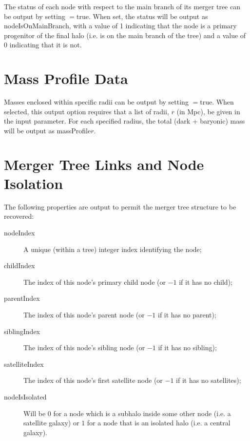 The status of each node with respect to the main branch of its merger tree can be output by setting {\normalfont \ttfamily [outputMainBranchStatus]}$=${\normalfont \ttfamily true}. When set, the status will be output as {\normalfont \ttfamily nodeIsOnMainBranch}, with a value of 1 indicating that the node is a primary progenitor of the final halo (i.e. is on the main branch of the tree) and a value of 0 indicating that it is not.

\section{Mass Profile Data}

Masses enclosed within specific radii can be output by setting {\normalfont \ttfamily [outputMassProfileData]}$=${\normalfont \ttfamily true}. When selected, this output option requires that a list of radii, $r$ (in Mpc), be given in the {\normalfont \ttfamily [outputMassProfileRadii]} input parameter. For each specified radius, the total (dark + baryonic) mass will be output as {\normalfont \ttfamily massProfile}$r$.

\section{Merger Tree Links and Node Isolation}

The following properties are output to permit the merger tree structure to be recovered:
\begin{description}
 \item [{\normalfont \ttfamily nodeIndex}] A unique (within a tree) integer index identifying the node;
 \item [{\normalfont \ttfamily childIndex}] The index of this node's primary child node (or $-1$ if it has no child);
 \item [{\normalfont \ttfamily parentIndex}] The index of this node's parent node (or $-1$ if it has no parent);
 \item [{\normalfont \ttfamily siblingIndex}] The index of this node's sibling node (or $-1$ if it has no sibling);
 \item [{\normalfont \ttfamily satelliteIndex}] The index of this node's first satellite node (or $-1$ if it has no satellites);
 \item [{\normalfont \ttfamily nodeIsIsolated}] Will be $0$ for a node which is a subhalo inside some other node (i.e. a satellite galaxy) or $1$ for a node that is an isolated halo (i.e. a central galaxy).
\end{description}

